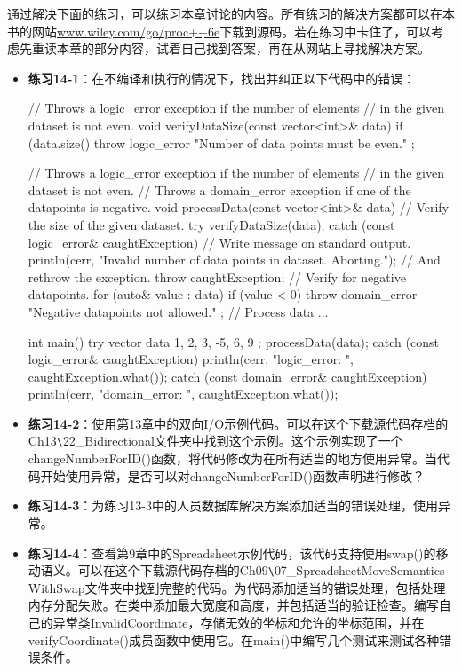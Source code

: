 通过解决下面的练习，可以练习本章讨论的内容。所有练习的解决方案都可以在本书的网站\url{www.wiley.com/go/proc++6e}下载到源码。若在练习中卡住了，可以考虑先重读本章的部分内容，试着自己找到答案，再在从网站上寻找解决方案。

\begin{itemize}
\item
\textbf{练习14-1}：在不编译和执行的情况下，找出并纠正以下代码中的错误：

\begin{cpp}
// Throws a logic_error exception if the number of elements
// in the given dataset is not even.
void verifyDataSize(const vector<int>& data)
{
    if (data.size() %
        throw logic_error { "Number of data points must be even." };
}

// Throws a logic_error exception if the number of elements
// in the given dataset is not even.
// Throws a domain_error exception if one of the datapoints is negative.
void processData(const vector<int>& data)
{
    // Verify the size of the given dataset.
    try {
        verifyDataSize(data);
    } catch (const logic_error& caughtException) {
        // Write message on standard output.
        println(cerr, "Invalid number of data points in dataset. Aborting.");
        // And rethrow the exception.
        throw caughtException;
    }
    // Verify for negative datapoints.
    for (auto& value : data) {
        if (value < 0)
            throw domain_error { "Negative datapoints not allowed." };
    }
    // Process data ...
}

int main()
{
    try {
        vector data { 1, 2, 3, -5, 6, 9 };
        processData(data);
    } catch (const logic_error& caughtException) {
        println(cerr, "logic_error: {}", caughtException.what());
    } catch (const domain_error& caughtException) {
        println(cerr, "domain_error: {}", caughtException.what());
    }
}
\end{cpp}

\item
\textbf{练习14-2}：使用第13章中的双向I/O示例代码。可以在这个下载源代码存档的Ch13\verb|\|22\_Bidirectional文件夹中找到这个示例。这个示例实现了一个changeNumberForID()函数，将代码修改为在所有适当的地方使用异常。当代码开始使用异常，是否可以对changeNumberForID()函数声明进行修改？

\item
\textbf{练习14-3}：为练习13-3中的人员数据库解决方案添加适当的错误处理，使用异常。

\item
\textbf{练习14-4}：查看第9章中的Spreadsheet示例代码，该代码支持使用swap()的移动语义。可以在这个下载源代码存档的Ch09\verb|\|07\_SpreadsheetMoveSemantics–WithSwap文件夹中找到完整的代码。为代码添加适当的错误处理，包括处理内存分配失败。在类中添加最大宽度和高度，并包括适当的验证检查。编写自己的异常类InvalidCoordinate，存储无效的坐标和允许的坐标范围，并在verifyCoordinate()成员函数中使用它。在main()中编写几个测试来测试各种错误条件。
\end{itemize}














